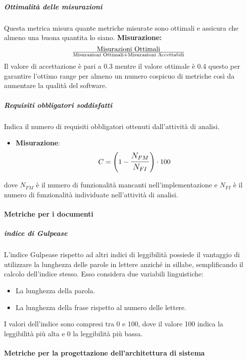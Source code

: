 \subparagraph{Ottimalità delle misurazioni}
Questa metrica misura quante metriche misurate sono ottimali e assicura che almeno una buona quantita lo siano.
\textbf{Misurazione:} 
\begin{displaymath}
{\text{Misurazioni Ottimali}}\over{\text{Misurazioni Ottimali} + \text{Misurazioni Accettabili}}
\end{displaymath} 
Il valore di accettazione è pari a 0.3 mentre il valore ottimale è 0.4 questo per garantire l'ottimo range per almeno un numero cospicuo di metriche così da aumentare la qualità del software.

\subparagraph{Requisiti obbligatori soddisfatti}
Indica il numero di requisiti obbligatori ottenuti dall'attività di analisi.
\begin{itemize}
\item \textbf{Misurazione}: 
		$$C=\left(1-\mathlarger{\frac{N_{FM}}{N_{FI}}}\right) \cdot 100$$ 
\end{itemize}
dove $N_{FM}$ è il numero di funzionalità mancanti nell'implementazione e $N_{FI}$ è il numero di funzionalità individuate nell'attività di analisi. 



\paragraph{Metriche per i documenti}
\subparagraph{indice di Gulpease}
L'indice Gulpease rispetto ad altri indici di leggibilità possiede il vantaggio di utilizzare la lunghezza delle parole in lettere anziché in sillabe, semplificando il calcolo dell'indice stesso. Esso considera due variabili linguistiche:
\begin{itemize}
\item La lunghezza della parola.
\item La lunghezza della frase rispetto al numero delle lettere.
\end{itemize}

I valori dell'indice sono compresi tra 0 e 100, dove il valore 100 indica la leggibilità più alta e 0 la leggibilità più bassa.

\paragraph{Metriche per la progettazione dell'architettura di sistema}

